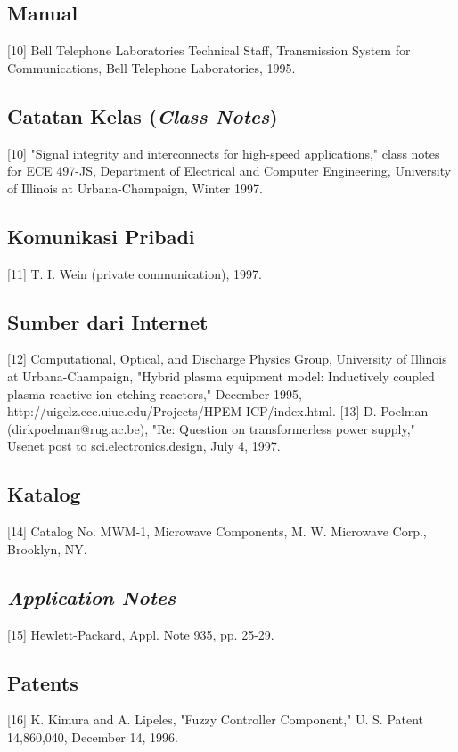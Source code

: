 \subsection{Manual}
[10] Bell Telephone Laboratories Technical Staff, Transmission System for Communications, Bell Telephone Laboratories, 1995.

\subsection{Catatan Kelas (\textit{Class Notes})}
[10] "Signal integrity and interconnects for high-speed applications," class notes for ECE 497-JS, Department of Electrical and Computer Engineering, University of Illinois at Urbana-Champaign, Winter 1997.

\subsection{Komunikasi Pribadi} 
[11] T. I. Wein (private communication), 1997.

\subsection{Sumber dari Internet}
[12] Computational, Optical, and Discharge Physics Group, University of Illinois at Urbana-Champaign, "Hybrid plasma equipment model: Inductively coupled plasma reactive ion etching reactors," December 1995, http://uigelz.ece.uiuc.edu/Projects/HPEM-ICP/index.html.
[13] D. Poelman (dirkpoelman@rug.ac.be), "Re: Question on transformerless power supply," Usenet post to sci.electronics.design, July 4, 1997.

\subsection{Katalog}
[14] Catalog No. MWM-1, Microwave Components, M. W. Microwave Corp., Brooklyn, NY. 

\subsection{\textit{Application Notes}}
[15] Hewlett-Packard, Appl. Note 935, pp. 25-29.

\subsection{Patents}
[16] K. Kimura and A. Lipeles, "Fuzzy Controller Component," U. S. Patent 14,860,040, December 14, 1996.

